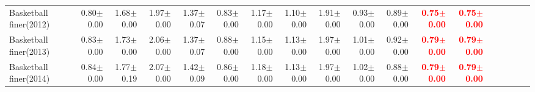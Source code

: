 \documentclass[nohyperref]{article}
\theoremstyle{plain}
\theoremstyle{definition}
\theoremstyle{remark}
\newcommand{\red}[1]{\textcolor{red}{\textbf{#1}}}
\begin{document}
\begin{table*}[!ht]
{\begin{tabular}{lrrrrrrrrrrrrrrrrr}
			Basketball finer(2012) & 0.80$\pm$0.00 & 1.68$\pm$0.00 & 1.97$\pm$0.00 & 1.37$\pm$0.07 & 0.83$\pm$0.00 & 1.17$\pm$0.00 & 1.10$\pm$0.00 & 1.91$\pm$0.00 & 0.93$\pm$0.00 & 0.89$\pm$0.00 & \red{0.75$\pm$0.00} & \red{0.75$\pm$0.00} \\
			Basketball finer(2013) & 0.83$\pm$0.00 & 1.73$\pm$0.00 & 2.06$\pm$0.00 & 1.37$\pm$0.07 & 0.88$\pm$0.00 & 1.15$\pm$0.00 & 1.13$\pm$0.00 & 1.97$\pm$0.00 & 1.01$\pm$0.00 & 0.92$\pm$0.00 & \red{0.79$\pm$0.00} & \red{0.79$\pm$0.00} \\
			Basketball finer(2014) & 0.84$\pm$0.00 & 1.77$\pm$0.19 & 2.07$\pm$0.00 & 1.42$\pm$0.09 & 0.86$\pm$0.00 & 1.18$\pm$0.00 & 1.13$\pm$0.00 & 1.97$\pm$0.00 & 1.02$\pm$0.00 & 0.88$\pm$0.00 & \red{0.79$\pm$0.00} & \red{0.79$\pm$0.00} \\
\bottomrule
\end{tabular}}
\end{table*}
\end{document}
